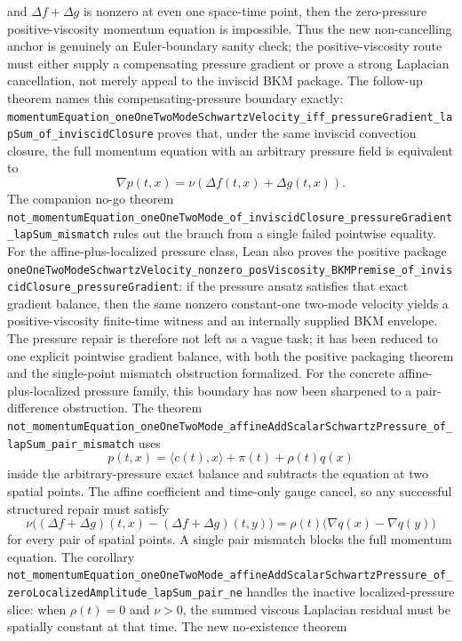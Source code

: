 \documentclass[11pt]{article}
\begin{document}
and \(\Delta f+\Delta g\) is nonzero at even one space-time point, then the
zero-pressure positive-viscosity momentum equation is impossible.  Thus the
new non-cancelling anchor is genuinely an Euler-boundary sanity check; the
positive-viscosity route must either supply a compensating pressure gradient or
prove a strong Laplacian cancellation, not merely appeal to the inviscid BKM
package.
The follow-up theorem names this compensating-pressure boundary exactly:
\texttt{momentumEquation\_oneOneTwoModeSchwartzVelocity\_iff\_pressureGradient\_lapSum\_of\_inviscidClosure}
proves that, under the same inviscid convection closure, the full momentum
equation with an arbitrary pressure field is equivalent to
\[
  \nabla p(t,x)=\nu(\Delta f(t,x)+\Delta g(t,x)).
\]
The companion no-go theorem
\texttt{not\_momentumEquation\_oneOneTwoMode\_of\_inviscidClosure\_pressureGradient\_lapSum\_mismatch}
rules out the branch from a single failed pointwise equality.  For the
affine-plus-localized pressure class, Lean also proves the positive package
\texttt{oneOneTwoModeSchwartzVelocity\_nonzero\_posViscosity\_BKMPremise\_of\_inviscidClosure\_pressureGradient}:
if the pressure ansatz satisfies that exact gradient balance, then the same
nonzero constant-one two-mode velocity yields a positive-viscosity finite-time
witness and an internally supplied BKM envelope.  The pressure repair is
therefore not left as a vague task; it has been reduced to one explicit
pointwise gradient balance, with both the positive packaging theorem and the
single-point mismatch obstruction formalized.
For the concrete affine-plus-localized pressure family, this boundary has now
been sharpened to a pair-difference obstruction.  The theorem
\texttt{not\_momentumEquation\_oneOneTwoMode\_affineAddScalarSchwartzPressure\_of\_lapSum\_pair\_mismatch}
uses
\[
  p(t,x)=\langle c(t),x\rangle+\pi(t)+\rho(t)q(x)
\]
inside the arbitrary-pressure exact balance and subtracts the equation at two
spatial points.  The affine coefficient and time-only gauge cancel, so any
successful structured repair must satisfy
\[
  \nu\big((\Delta f+\Delta g)(t,x)-(\Delta f+\Delta g)(t,y)\big)
  =
  \rho(t)\big(\nabla q(x)-\nabla q(y)\big)
\]
for every pair of spatial points.  A single pair mismatch blocks the full
momentum equation.  The corollary
\texttt{not\_momentumEquation\_oneOneTwoMode\_affineAddScalarSchwartzPressure\_of\_zeroLocalizedAmplitude\_lapSum\_pair\_ne}
handles the inactive localized-pressure slice: when \(\rho(t)=0\) and
\(\nu>0\), the summed viscous Laplacian residual must be spatially constant at
that time.
The new no-existence theorem
\end{document}
